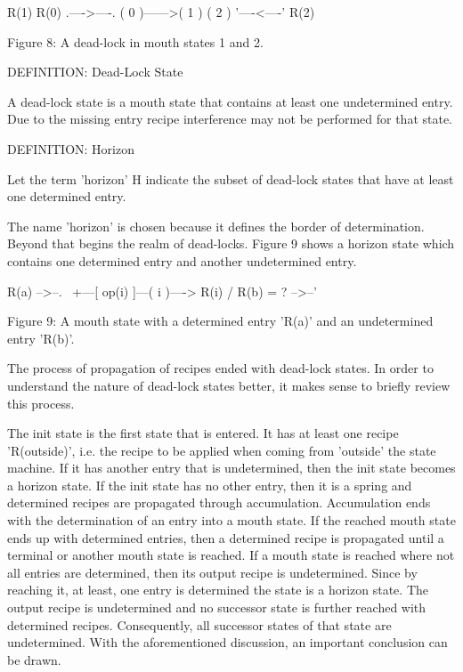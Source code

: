 \documentclass[12pt]{article}
\begin{document}
                                       R(1)
                          R(0)     .---->----.
                    ( 0 )------>( 1 )       ( 2 )
                                   '----<----'
                                       R(2)

           Figure 8: A dead-lock in mouth states 1 and 2.

DEFINITION: Dead-Lock State

   A dead-lock state is a mouth state that contains at least one undetermined
   entry. Due to the missing entry recipe interference may not be performed
   for that state.

DEFINITION: Horizon

   Let the term 'horizon' H indicate the subset of dead-lock states that have
   at least one determined entry.

The name 'horizon' is chosen because it defines the border of determination.
Beyond that begins the realm of dead-locks. Figure 9 shows a horizon state
which contains one determined entry and another undetermined entry.

                         R(a) -->--.
                                    \
                                     +---[ op(i) ]---( i )----> R(i)
                                    /
                     R(b) = ? -->--'

          Figure 9: A mouth state with a determined entry 'R(a)' and 
                    an undetermined entry 'R(b)'.

The process of propagation of recipes ended with dead-lock states. In order
to understand the nature of dead-lock states better, it makes sense to briefly
review this process. 

The init state is the first state that is entered. It has at least one recipe
'R(outside)', i.e. the recipe to be applied when coming from 'outside' the
state machine. If it has another entry that is undetermined, then the init
state becomes a horizon state. If the init state has no other entry, then it is
a spring and determined recipes are propagated through accumulation.
Accumulation ends with the determination of an entry into a mouth state. If the
reached mouth state ends up with determined entries, then a determined recipe
is propagated until a terminal or another mouth state is reached. If a mouth
state is reached where not all entries are determined, then its output recipe
is undetermined. Since by reaching it, at least, one entry is determined the
state is a horizon state. The output recipe is undetermined and no successor
state is further reached with determined recipes. Consequently, all successor
states of that state are undetermined.  With the aforementioned discussion, an
important conclusion can be drawn.
\end{document}
